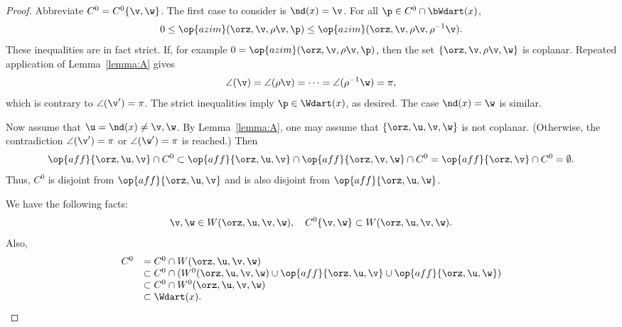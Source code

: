 \begin{proof} Abbreviate $C^0 = C^0\{\v,\w\}$.  The first case to
consider is $\nd(x)=\v$.  For all $\p\in C^0\cap \bWdart(x)$,
\begin{displaymath}
  0 \le \op{azim}(\orz,\v,\rho \v,\p) 
\le \op{azim}(\orz,\v,\rho \v,\rho^{-1} \v).
\end{displaymath}  
These inequalities are in fact strict.  If, for example $0 =
\op{azim}(\orz,\v,\rho \v,\p)$, then the set $\{\orz,\v,\rho \v,\w\}$
is coplanar.  Repeated application of Lemma~\ref{lemma:A} gives
\begin{displaymath}
\angle(\v) = \angle(\rho \v) = \cdots = \angle(\rho^{-1} \w) = \pi,
\end{displaymath}
which is contrary to $\angle(\v') = \pi$.  The strict inequalities
imply $\p\in \Wdart(x)$, as desired.  The case $\nd(x)=\w$ is similar.

Now assume that $\u=\nd(x)\ne \v,\w$.  By Lemma~\ref{lemma:A}, one may
assume that $\{\orz,\u,\v,\w\}$ is not coplanar.  (Otherwise, the
contradiction $\angle(\v')=\pi$ or $\angle(\w')=\pi$ is reached.) Then
\begin{displaymath}
  \op{aff}\{\orz,\u,\v\}\cap C^0 \subset \op{aff}\{\orz,\u,\v\}
  \cap \op{aff}\{\orz,\v,\w\} \cap C^0 
= \op{aff}\{\orz,\v\} \cap C^0 = \emptyset.
\end{displaymath}
Thus, $C^0$ is disjoint from $\op{aff}\{\orz,\u,\v\}$ and is also
disjoint from $\op{aff}\{\orz,\u,\w\}$.

We have the following facts:
\begin{displaymath}
\v,\w\in W(\orz,\u,\v,\w),\quad C^0\{\v,\w\} \subset W(\orz,\u,\v,\w).
\end{displaymath}
Also,
\begin{displaymath}
\begin{array}{rll}
  C^0 &= C^0\cap W(\orz,\u,\v,\w) \\
  &\subset C^0 \cap (W^0(\orz,\u,\v,\w) 
\cup \op{aff}\{\orz,\u,\v\} \cup \op{aff}\{\orz,\u,\w\})\\
  &\subset C^0 \cap W^0(\orz,\u,\v,\w)\\
  &\subset \Wdart(x).
\end{array}
\end{displaymath}
\end{proof}

